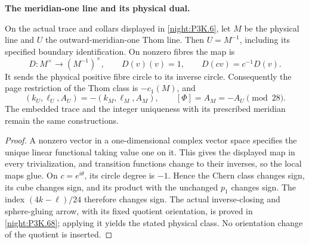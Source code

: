 \begin{proposition}\label{iv:correction:P3K.6}
\textbf{The meridian-one line and its physical dual.}\par
On the actual trace and collars displayed in
\cref{night:P3K.6}, let \(M\) be the physical line and \(U\) the
outward-meridian-one Thom line. Then \(U=M^{-1}\), including its
specified boundary identification. On nonzero fibres the map is
\[
 D:M^\times\longrightarrow (M^{-1})^\times,
 \qquad D(v)(v)=1,\qquad D(cv)=c^{-1}D(v).
\]
It sends the physical positive fibre circle to its inverse circle.
Consequently the page restriction of the Thom class is \(-c_1(M)\),
and
\[
 (k_U,\ell_U,A_U)=-(k_M,\ell_M,A_M),\qquad [\Phi]=A_M=-A_U\pmod{28}.
\]
The embedded trace and the integer uniqueness with its prescribed
meridian remain the same constructions.
\end{proposition}
\begin{proof}
A nonzero vector in a one-dimensional complex vector space
specifies the unique linear functional taking value one on it. This
gives the displayed map in every trivialization, and transition
functions change to their inverses, so the local maps glue. On
\(c=e^{i\theta}\), its circle degree is \(-1\). Hence the Chern class
changes sign, its cube changes sign, and its product with the unchanged
\(p_1\) changes sign. The index \((4k-\ell)/24\) therefore changes
sign. The actual inverse-closing and sphere-gluing arrow, with its
fixed quotient orientation, is proved in \cref{night:P3K.68}; applying
it yields the stated physical class. No orientation change of the
quotient is inserted.
\end{proof}



